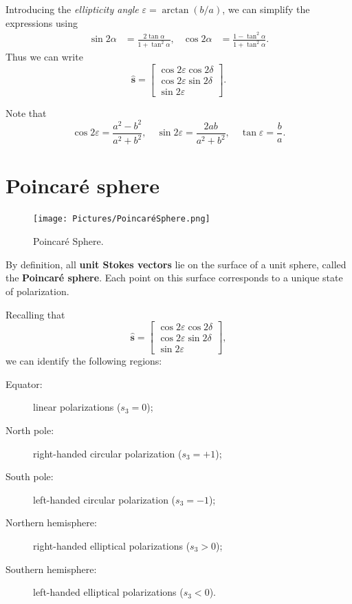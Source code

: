 Introducing the \emph{ellipticity angle} $\varepsilon = \arctan(b/a)$, we can simplify the expressions using
\begin{align}
    \sin 2\alpha &= \frac{2\tan\alpha}{1+\tan^2\alpha}, &
    \cos 2\alpha &= \frac{1-\tan^2\alpha}{1+\tan^2\alpha}.
\end{align}
Thus we can write
\begin{equation}
    \hat{\mathbf{s}} =
    \begin{bmatrix}
        \cos 2\varepsilon \cos 2\delta\\[4pt]
        \cos 2\varepsilon \sin 2\delta\\[4pt]
        \sin 2\varepsilon
    \end{bmatrix}.
\end{equation}

\medskip
Note that
\[
\cos 2\varepsilon = \frac{a^2 - b^2}{a^2 + b^2},
\quad
\sin 2\varepsilon = \frac{2ab}{a^2 + b^2},
\quad
\tan \varepsilon = \frac{b}{a}.
\]

\section{Poincaré sphere}
\begin{figure}[h]
    \centering
    \texttt{[image: Pictures/PoincaréSphere.png]}
    \caption{Poincaré Sphere.}
\end{figure}

By definition, all \textbf{unit Stokes vectors} lie on the surface of a unit sphere,  
called the \textbf{Poincaré sphere}. Each point on this surface corresponds to a unique state of polarization.

Recalling that
\[
\hat{\mathbf{s}} =
\begin{bmatrix}
    \cos 2\varepsilon \cos 2\delta\\
    \cos 2\varepsilon \sin 2\delta\\
    \sin 2\varepsilon
\end{bmatrix},
\]
we can identify the following regions:
\begin{description}
    \item[Equator:] linear polarizations ($s_3 = 0$);
    \item[North pole:] right-handed circular polarization ($s_3 = +1$);
    \item[South pole:] left-handed circular polarization ($s_3 = -1$);
    \item[Northern hemisphere:] right-handed elliptical polarizations ($s_3 > 0$);
    \item[Southern hemisphere:] left-handed elliptical polarizations ($s_3 < 0$).
\end{description}

